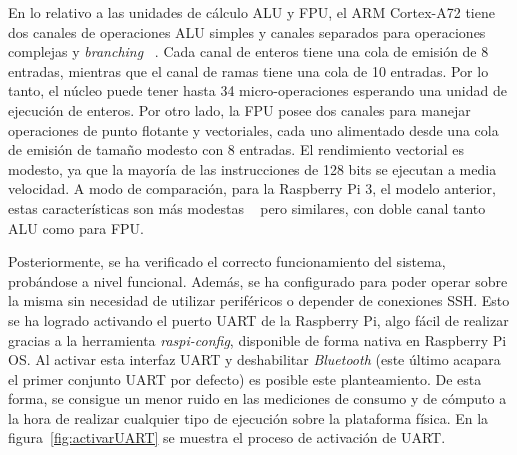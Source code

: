 En lo relativo a las unidades de cálculo \ac{ALU} y \ac{FPU}, el \ac{ARM} Cortex-A72 tiene dos canales de operaciones ALU simples y canales separados para operaciones complejas y \textit{branching} ~\cite{datasheetA72}. Cada canal de enteros tiene una cola de emisión de 8 entradas, mientras que el canal de ramas tiene una cola de 10 entradas. Por lo tanto, el núcleo puede tener hasta 34 micro-operaciones esperando una unidad de ejecución de enteros. Por otro lado, la FPU posee dos canales para manejar operaciones de punto flotante y vectoriales, cada uno alimentado desde una cola de emisión de tamaño modesto con 8 entradas. El rendimiento vectorial es modesto, ya que la mayoría de las instrucciones de 128 bits se ejecutan a media velocidad. A modo de comparación, para la Raspberry Pi 3, el modelo anterior, estas características son más modestas ~\cite{datasheetA53} pero similares, con doble canal tanto ALU como para FPU.

Posteriormente, se ha verificado el correcto funcionamiento del sistema, probándose a nivel funcional. Además, se ha configurado para poder operar sobre la misma sin necesidad de utilizar periféricos o depender de conexiones \ac{SSH}. Esto se ha logrado activando el puerto \ac{UART} de la Raspberry Pi, algo fácil de realizar gracias a la herramienta \textit{raspi-config}, disponible de forma nativa en Raspberry Pi OS. Al activar esta interfaz \ac{UART} y deshabilitar \textit{Bluetooth} (este último acapara el primer conjunto \ac{UART} por defecto) es posible este planteamiento. De esta forma, se consigue un menor ruido en las mediciones de consumo y de cómputo a la hora de realizar cualquier tipo de ejecución sobre la plataforma física. En la figura~\ref{fig:activarUART} se muestra el proceso de activación de \ac{UART}.

